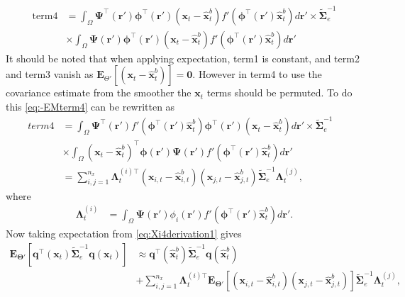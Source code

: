\documentclass[]{article}
\begin{document}
\begin{align}\label{eq:-EMterm4}
 \mathrm{term4} &=\int_\Omega \boldsymbol{\Psi}^\top(\mathbf{r}')\boldsymbol \phi^\top(\mathbf r') (\mathbf x_t - \mathbf  {\hat x}_t^b)f'(\boldsymbol \phi^\top(\mathbf r')\mathbf {\hat x}_t^b) d\mathbf{r}' \times \tilde{\boldsymbol  \Sigma}_e^{-1} \nonumber \\
&\times \int_\Omega \boldsymbol{\Psi}(\mathbf{r}')\boldsymbol \phi^\top(\mathbf r') (\mathbf x_t - \mathbf  {\hat x}_t^b)f'(\boldsymbol \phi^\top(\mathbf r')\mathbf {\hat x}_t^b) d\mathbf{r}' 
\end{align}
It should be noted that when applying expectation, term1 is constant, and term2 and term3 vanish as $\mathbf E_{\Theta'}\left[(\mathbf x_t - \mathbf  {\hat x}_t^b)\right]= \mathbf 0$. However in term4 to use the covariance estimate from the smoother the $\mathbf{x}_t$ terms should be permuted. To do this \eqref{eq:-EMterm4} can be rewritten as 
\begin{align}
 term4 &= \int_\Omega \boldsymbol{\Psi}^\top(\mathbf{r}')f'(\boldsymbol \phi^\top(\mathbf r')\mathbf {\hat x}_t^b) \boldsymbol \phi^\top(\mathbf r')(\mathbf x_t - \mathbf  {\hat x}_t^b)d\mathbf{r}' \times \tilde{\boldsymbol\Sigma}_e^{-1} \nonumber \\
&\times\int_\Omega  (\mathbf x_t - \mathbf  {\hat x}_t^b)^\top\boldsymbol \phi(\mathbf r') \boldsymbol{\Psi}(\mathbf{r}')f'(\boldsymbol \phi^\top(\mathbf r')\mathbf {\hat x}_t^b) d\mathbf{r}'& \nonumber \\
&=\sum_{i,j=1}^{n_x}{\boldsymbol\Lambda}_t^{(i)\top}(\mathbf x_{i,t} - \mathbf  {\hat x}_{i,t}^b)(\mathbf x_{j,t} - \mathbf  {\hat x}_{j,t}^b)\tilde{\boldsymbol\Sigma}_e^{-1}{\boldsymbol\Lambda}_t^{(j)},
\end{align}
where
\begin{align}
	{\boldsymbol \Lambda}_t^{(i)}&=\int_{\Omega} \boldsymbol \Psi(\mathbf r')\phi_i(\mathbf r')f'(\boldsymbol\phi^\top(\mathbf r')\mathbf {\hat x}_t^b)d\mathbf r' \label{eq:lambdatildei}.
\end{align}
Now taking expectation from \eqref{eq:Xi4derivation1} gives
\begin{align}\label{eq:Xi4derivation2}
  \mathbf{E}_{\boldsymbol\Theta'}\left[ \mathbf q^\top(\mathbf x_t)\tilde{\boldsymbol\Sigma}_e^{-1}\mathbf q(\mathbf x_t)\right] &\approx \mathbf q^\top(\mathbf {\hat x}_t^b)\tilde{\boldsymbol\Sigma}_e^{-1}\mathbf q(\mathbf {\hat x}_t^b)\nonumber \\
&+\sum_{i,j=1}^{n_x}{\boldsymbol\Lambda}_t^{(i)\top}\mathbf{E}_{\boldsymbol\Theta'}\left[(\mathbf x_{i,t} - \mathbf  {\hat x}_{i,t}^b)(\mathbf x_{j,t} - \mathbf  {\hat x}_{j,t}^b)\right] \tilde{\boldsymbol\Sigma}_e^{-1}{\boldsymbol\Lambda}_t^{(j)},
\end{align}
\end{document}
